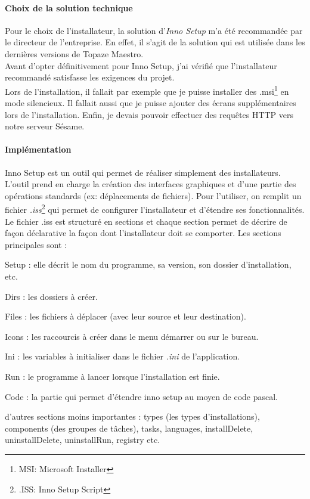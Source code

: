 \paragraph*{Choix de la solution technique\\}
Pour le choix de l'installateur, la solution d'\textit{Inno Setup} m'a été recommandée par le directeur de l'entreprise. En effet, il s'agit de la solution qui est utilisée dans les dernières versions de Topaze Maestro.\\
Avant d'opter définitivement pour Inno Setup, j'ai vérifié que l'installateur recommandé satisfasse les exigences du projet.\\ Lors de l'installation, il fallait par exemple que je puisse installer des .msi\footnote{MSI: Microsoft Installer} en mode silencieux. Il fallait aussi que je puisse ajouter des écrans supplémentaires lors de l'installation. Enfin, je devais pouvoir effectuer des requêtes HTTP vers notre serveur Sésame.

\paragraph*{Implémentation\\}
Inno Setup est un outil qui permet de réaliser simplement des installateurs. L'outil prend en charge la création des interfaces graphiques et d'une partie des opérations standards (ex: déplacements de fichiers). Pour l'utiliser, on remplit un fichier \textit{.iss}\footnote{.ISS: Inno Setup Script} qui permet de configurer l'installateur et d'étendre ses fonctionnalités. Le fichier .iss est structuré en sections et chaque section permet de décrire de façon déclarative la façon dont l'installateur doit se comporter. Les sections principales sont : 
\begin{sitemize}
\item Setup : elle décrit le nom du programme, sa version, son dossier d'installation, etc.
\item Dirs : les dossiers à créer.
\item Files : les fichiers à déplacer (avec leur source et leur destination).
\item Icons : les raccourcis à créer dans le menu démarrer ou sur le bureau.
\item Ini : les variables à initialiser dans le fichier \textit{.ini} de l'application.
\item Run : le programme à lancer lorsque l'installation est finie.
\item Code : la partie qui permet d'étendre inno setup au moyen de code pascal.
\item d'autres sections moins importantes : types (les types d'installations), components (des groupes de tâches), tasks, languages, installDelete, uninstallDelete, uninstallRun, registry etc.
\end{sitemize}  

